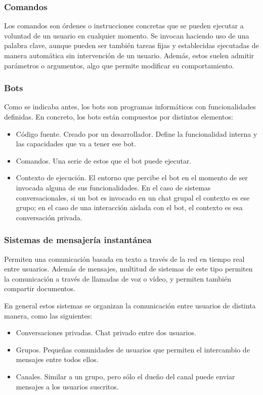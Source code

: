 \subsubsection{Comandos}

Los comandos son órdenes o instrucciones concretas que se pueden ejecutar a voluntad de un usuario en cualquier momento. Se invocan haciendo uso de una palabra clave, aunque pueden ser también tareas fijas y establecidas ejecutadas de manera automática sin intervención de un usuario. Además, estos suelen admitir parámetros o argumentos, algo que permite modificar su comportamiento.

\subsubsection{Bots}

Como se indicaba antes, los bots son programas informáticos con funcionalidades definidas. En concreto, los bots están compuestos por distintos elementos:

\begin{itemize}
	\item Código fuente. Creado por un desarrollador. Define la funcionalidad interna y las capacidades que va a tener ese bot.
	\item Comandos. Una serie de estos que el bot puede ejecutar.
	\item Contexto de ejecución. El entorno que percibe el bot en el momento de ser invocada alguna de sus funcionalidades. En el caso de sistemas conversacionales, si un bot es invocado en un chat grupal el contexto es ese grupo; en el caso de una interacción aislada con el bot, el contexto es esa conversación privada.
\end{itemize}

\subsubsection{Sistemas de mensajería instantánea}

Permiten una comunicación basada en texto a través de la red en tiempo real entre usuarios. Además de mensajes, multitud de sistemas de este tipo permiten la comunicación a través de llamadas de voz o vídeo, y permiten también compartir documentos.

En general estos sistemas se organizan la comunicación entre usuarios de distinta manera, como las siguientes:

\begin{itemize}
	\item Conversaciones privadas. Chat privado entre dos usuarios.
	\item Grupos. Pequeñas comunidades de usuarios que permiten el intercambio de mensajes entre todos ellos.
	\item Canales. Similar a un grupo, pero sólo el dueño del canal puede enviar mensajes a los usuarios suscritos.
\end{itemize}


